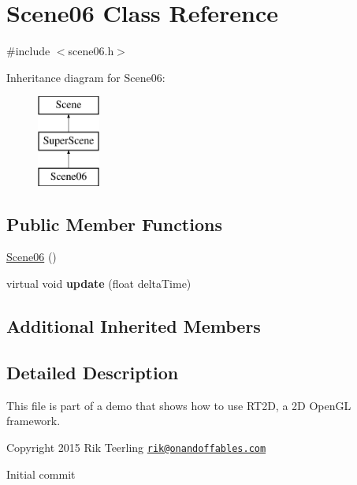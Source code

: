\hypertarget{class_scene06}{}\section{Scene06 Class Reference}
\label{class_scene06}


{\ttfamily \#include $<$scene06.\+h$>$}

Inheritance diagram for Scene06\+:\begin{figure}[H]
\begin{center}
\leavevmode
\includegraphics[height=3.000000cm]{class_scene06}
\end{center}
\end{figure}
\subsection*{Public Member Functions}
\begin{DoxyCompactItemize}
\item 
\hyperlink{class_scene06_a0fe3319d082e484405ec497d809f20eb}{Scene06} ()
\item 
\mbox{\label{class_scene06_af8bfea85334f834952d409b8b85084fe}} 
virtual void {\bfseries update} (float delta\+Time)
\end{DoxyCompactItemize}
\subsection*{Additional Inherited Members}


\subsection{Detailed Description}
This file is part of a demo that shows how to use R\+T2D, a 2D Open\+GL framework.


\begin{DoxyItemize}
\item Copyright 2015 Rik Teerling \href{mailto:rik@onandoffables.com}{\tt rik@onandoffables.\+com}
\begin{DoxyItemize}
\item Initial commit 
\end{DoxyItemize}
\end{DoxyItemize}

